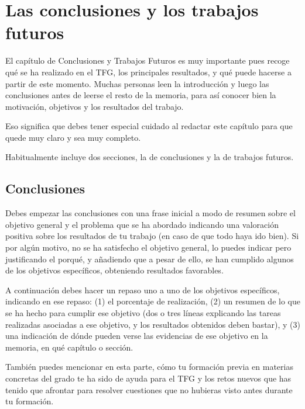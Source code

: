 \chapter{Las conclusiones y los trabajos futuros}
\label{cap:Conclusiones}

El capítulo de Conclusiones y Trabajos Futuros es muy importante pues recoge qué se ha realizado en el TFG, los principales resultados, y qué puede hacerse a partir de este momento. Muchas personas leen la introducción y luego las conclusiones antes de leerse el resto de la memoria, para así conocer bien la motivación, objetivos y los resultados del trabajo.

Eso significa que debes tener especial cuidado al redactar este capítulo para que quede muy claro y sea muy completo.

Habitualmente incluye dos secciones, la de conclusiones y la de trabajos futuros.
 
 \section{Conclusiones}

Debes empezar las conclusiones con una frase inicial a modo de resumen sobre el objetivo general y el problema que se ha abordado indicando una valoración positiva sobre los resultados de tu trabajo (en caso de que todo haya ido bien). Si por algún motivo, no se ha satisfecho el objetivo general, lo puedes indicar pero justificando el porqué, y añadiendo que a pesar de ello, se han cumplido algunos de los objetivos específicos, obteniendo resultados favorables. 

A continuación debes hacer un repaso uno a uno de los objetivos específicos, indicando en ese repaso: (1) el porcentaje de realización, (2) un resumen de lo que se ha hecho para cumplir ese objetivo (dos o tres líneas explicando las tareas realizadas asociadas a ese objetivo, y los resultados obtenidos deben bastar), y (3) una indicación de dónde pueden verse las evidencias de ese objetivo en la memoria, en qué capítulo o sección.

También puedes mencionar en esta parte, cómo tu formación previa en materias concretas del grado te ha sido de ayuda para el TFG y los retos nuevos que has tenido que afrontar para resolver cuestiones que no hubieras visto antes durante tu formación.

